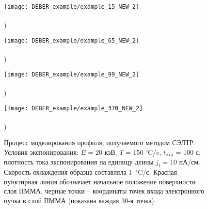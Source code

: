 \begin{figure}[h!]
	\begin{minipage}{0.48\textwidth}
		\texttt{[image: DEBER\_example/example\_15\_NEW\_2]} \\
		\vspace{-13em} \\ ) \\ \vspace{13em}
	\end{minipage}
	\begin{minipage}{0.48\textwidth}
		\texttt{[image: DEBER\_example/example\_65\_NEW\_2]} \\
		\vspace{-13em} \\ ) \\ \vspace{13em}
	\end{minipage}
	
	\vspace{-3em}
	
	\begin{minipage}{0.48\textwidth}
		\texttt{[image: DEBER\_example/example\_99\_NEW\_2]} \\
		\vspace{-13em} \\ ) \\ \vspace{13em}
	\end{minipage}
	\begin{minipage}{0.48\textwidth}
		\texttt{[image: DEBER\_example/example\_370\_NEW\_2]} \\
		\vspace{-13em} \\ ) \\ \vspace{13em}
	\end{minipage}
	\vspace{-3em}
	\caption{
		Процесс моделирования профиля, получаемого методом СЭЛТР.
		Условия экспонирования: $E$ = 20 кэВ, $T$ = 150 $^{\circ}$C/c, $t_\mathrm{exp}$ = 100 с, плотность тока экспонирования на единицу длины $j_\mathrm{l}$ = 10 пА/см.
		Скорость охлаждения образца составляла 1~$^{\circ}$C/с.
		Красная пунктирная линия обозначает начальное положение поверхности слоя ПММА, черные точки -- координаты точек входа электронного пучка в слой ПММА (показана каждая 30-я точка).}
	\label{fig:DEBER_example}
\end{figure}

